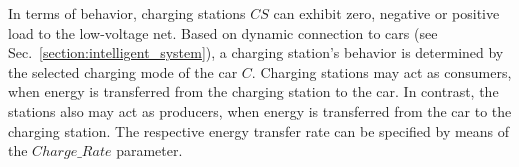 In terms of behavior, charging stations $CS$ can exhibit zero, negative or positive load to the low-voltage net. Based on dynamic connection to cars (see Sec.~\ref{section:intelligent_system}), a charging station's behavior is determined by the selected charging mode of the car $C$. Charging stations may act as consumers, when energy is transferred from the charging station to the car. In contrast, the stations also may act as producers, when energy is transferred from the car to the charging station. The respective energy transfer rate can be specified by means of the $Charge\_Rate$ parameter.